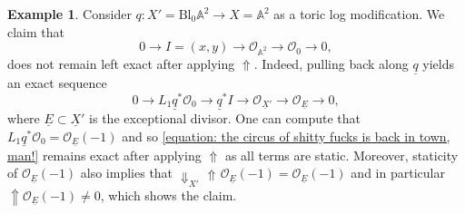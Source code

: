 \documentclass[11pt]{amsart}
\theoremstyle{definition}
\theoremstyle{definition}
\newtheorem{example}[theorem]{Example}
\DeclareMathOperator{\arrowup}{\!\Uparrow \!}
\newcommand{\cO}{\mathcal{O}}
\newcommand{\ul}[1]{\underline{#1}}
\newcommand{\cal}{\mathcal}
\def\cO{{\cal O}}
\begin{document}
\begin{example}\label{example: up not exact}
    Consider $q\colon X' = \text{Bl}_0 \mathbb{A}^2 \rightarrow X = \mathbb{A}^2$ as a toric log modification. We claim that  
    \[
        0\longrightarrow I = (x,y) \longrightarrow \cO_{\mathbb{A}^2} \longrightarrow \cO_0\longrightarrow 0,
    \]
    does not remain left exact after applying $\Uparrow$. Indeed, pulling back along $\ul{q}$ yields an exact sequence
    \begin{equation}\label{equation: the circus of shitty fucks is back in town, man!}
        0\longrightarrow L_1\ul{q}^* \cO_0 \longrightarrow \ul{q}^*I\longrightarrow \cO_{\ul{X}'} \longrightarrow \cO_{\ul{E}}\longrightarrow 0,
    \end{equation}
    where $\ul{E}\subset\ul{X}'$ is the exceptional divisor. One can compute that $L_1\ul{q}^* \cO_0 = \cO_{\ul{E}}(-1)$ and so \eqref{equation: the circus of shitty fucks is back in town, man!} remains exact after applying $\Uparrow$ as all terms are static. Moreover, staticity of $\cO_{\ul{E}}(-1)$ also implies that $\Downarrow_{X'}\arrowup \cO_{\ul{E}}(-1) = \cO_{\ul{E}}(-1)$ and in particular $\Uparrow\!\! \cO_{\ul{E}}(-1)\neq 0$, which shows the claim.
\end{example}
\end{document}
